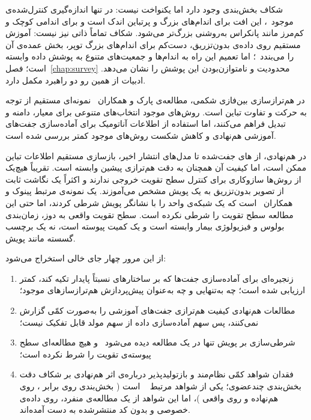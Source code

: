 شکاف بخش‌بندی وجود دارد اما یکنواخت نیست: در تنها اندازه‌گیری کنترل‌شده‌ی موجود~\cite{jeon2024fully}، این افت برای اندام‌های بزرگ و پرتباین اندک است و برای اندامی کوچک و کم‌مرز مانند پانکراس به‌روشنی بزرگ‌تر می‌شود. شکاف تماماً ذاتی نیز نیست: آموزش مستقیم روی داده‌ی بدون‌تزریق، دست‌کم برای اندام‌های بزرگ توپر، بخش عمده‌ی آن را می‌بندد~\cite{park2025nect}؛ اما تعمیم این راه به اندام‌ها و جمعیت‌های متنوع به پوشش داده وابسته است؛ فصل~\ref{chap:survey} محدودیت و نامتوازن‌بودن این پوشش را نشان می‌دهد. ادبیات از همین رو دو راهبرد مکمل دارد.

در هم‌ترازسازی بین‌فازی شکمی، مطالعه‌ی پارک و همکاران~\cite{park2021multiphase} نمونه‌ای مستقیم از توجه به حرکت و تفاوت تباین است. روش‌های موجود انتخاب‌های متنوعی برای معیار، دامنه و تبدیل فراهم می‌کنند، اما استفاده از اطلاعات آناتومیک برای آماده‌سازی جفت‌های آموزشی هم‌نهادی و کاهش شکست روش‌های موجود کمتر بررسی شده است.

در هم‌نهادی، از های جفت‌شده تا مدل‌های انتشار اخیر، بازسازی مستقیم اطلاعات تباین ممکن است، اما کیفیت آن همچنان به دقت هم‌ترازی پیشین وابسته است. تقریباً هیچ‌یک از روش‌ها سازوکاری برای کنترل سطح تقویت خروجی ندارند و اکثراً یک نگاشت ثابت از تصویر بدون‌تزریق به یک پویش مشخص می‌آموزند. یک نمونه‌ی مرتبط پینوک و همکاران~\cite{Pin23} است که یک شبکه‌ی واحد را با نشانگر پویش شرطی کردند، اما حتی این مطالعه سطح تقویت را شرطی نکرده است. سطح تقویت واقعی به دوز، زمان‌بندی بولوس و فیزیولوژی بیمار وابسته است و یک کمیت پیوسته است، نه یک برچسب گسسته مانند پویش.

از این مرور چهار جای خالی استخراج می‌شود:
\begin{enumerate}
\item زنجیره‌ای برای آماده‌سازی جفت‌ها که بر ساختارهای نسبتاً پایدار تکیه کند، کمتر ارزیابی شده است؛ چه به‌تنهایی و چه به‌عنوان پیش‌پردازش هم‌ترازسازهای موجود؛
\item مطالعات هم‌نهادی کیفیت هم‌ترازی جفت‌های آموزشی را به‌صورت کمّی گزارش نمی‌کنند، پس سهم آماده‌سازی داده از سهم مولد قابل تفکیک نیست؛
\item شرطی‌سازی بر پویش تنها در یک مطالعه دیده می‌شود~\cite{Pin23} و هیچ مطالعه‌ای سطح پیوسته‌ی تقویت را شرط نکرده است؛
\item فقدان شواهد کمّی نظام‌مند و بازتولیدپذیر درباره‌ی اثر هم‌نهادی بر شکاف دقت بخش‌بندی چندعضوی؛ یکی از شواهد مرتبط ~\cite{Zho24} است ( بخش‌بندی روی  برابر ، روی  هم‌نهاده  و روی  واقعی )، اما این شواهد از یک مطالعه‌ی منفرد، روی داده‌ی خصوصی و بدون کد منتشرشده به دست آمده‌اند.
\end{enumerate}
